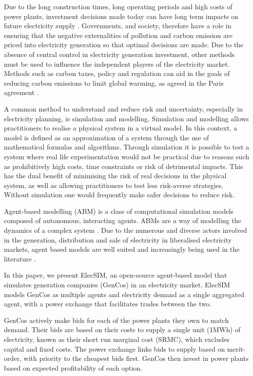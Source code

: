 Due to the long construction times, long operating periods and high costs of power plants, investment decisions made today can have long term impacts on future electricity supply \cite{Chappin2017}. Governments, and society, therefore have a role in ensuring that the negative externalities of pollution and carbon emission are priced into electricity generation so that optimal decisions are made. Due to the absence of central control in electricity generation investment, other methods must be used to influence the independent players of the electricity market. Methods such as carbon taxes, policy and regulation can aid in the goals of reducing carbon emissions to limit global warming, as agreed in the Paris agreement \cite{May2002}.

A common method to understand and reduce risk and uncertainty, especially in electricity planning, is simulation and modelling. Simulation and modelling allows practitioners to realise a physical system in a virtual model. In this context, a model is defined as an approximation of a system through the use of mathematical formulas and algorithms. Through simulation it is possible to test a system where real life experimentation would not be practical due to reasons such as prohibitively high costs, time constraints or risk of detrimental impacts. This has the dual benefit of minimising the risk of real decisions in the physical system, as well as allowing practitioners to test less risk-averse strategies. Without simulation one would frequently make safer decisions to reduce risk.

Agent-based modelling (ABM) is a class of computational simulation models composed of autonomous, interacting agents. ABMs are a way of modelling the dynamics of a complex system \cite{MacAl2010}. Due to the numerous and diverse actors involved in the generation, distribution and sale of electricity in liberalised electricity markets, agent based models are well suited and increasingly being used in the literature \cite{Zhou2007}.


In this paper, we present ElecSIM, an open-source agent-based model that simulates generation companies (GenCos) in an electricity market. ElecSIM models GenCos as multiple agents and electricity demand as a single aggregated agent, with a power exchange that facilitates trades between the two. 

GenCos actively make bids for each of the power plants they own to match demand. Their bids are based on their costs to supply a single unit (1MWh) of electricity, known as their short run marginal cost (SRMC), which excludes capital and fixed costs. The power exchange links bids to supply based on merit-order, with priority to the cheapest bids first. GenCos then invest in power plants based on expected profitability of each option.


